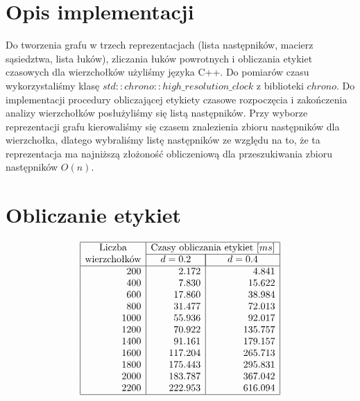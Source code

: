 \documentclass[polish,polish,a4paper]{article}
\begin{document}
\begin{spacing}{1.25}

\section{Opis implementacji }

Do tworzenia grafu w trzech reprezentacjach (lista następników, macierz sąsiedztwa, lista łuków), zliczania łuków powrotnych i obliczania etykiet czasowych dla wierzchołków użyliśmy języka C++. Do pomiarów czasu wykorzystaliśmy klasę $std :: chrono :: high\_resolution\_clock$ z biblioteki $chrono$. Do implementacji procedury obliczającej etykiety czasowe rozpoczęcia i zakończenia analizy wierzchołków posłużyliśmy się listą następników. Przy wyborze reprezentacji grafu kierowaliśmy się czasem znalezienia zbioru następników dla wierzchołka, dlatego wybraliśmy listę następników ze względu na to, że ta reprezentacja ma najniższą złożoność obliczeniową dla przeszukiwania zbioru następników $O(n)$.  

\section{Obliczanie etykiet}

\begin{spacing}{1.5}
	\begin{equation*}
	\begin{array}{|r|r|r|}
	\hline
	\multicolumn{1}{|c|}{$Liczba$}&\multicolumn{2}{c|}{$Czasy obliczania etykiet $[ms]}\\\cline{2-3}
	\multicolumn{1}{|c|}{$wierzchołków$}&\multicolumn{1}{c|}{\quad d=0.2\quad}&\multicolumn{1}{|c|}{d=0.4}\\
	\hline
	200&2.172&4.841\\
	400&7.830&15.622\\
	600&17.860&38.984\\
	800&31.477&72.013\\
	1000&55.936&92.017\\
	1200&70.922&135.757\\
	1400&91.161&179.157\\
	1600&117.204&265.713\\
	1800&175.443&295.831\\
	2000&183.787&367.042\\
	2200&222.953&616.094\\
	\hline
	\end{array}
	\end{equation*}
\end{spacing}


\end{spacing}
\end{document}
